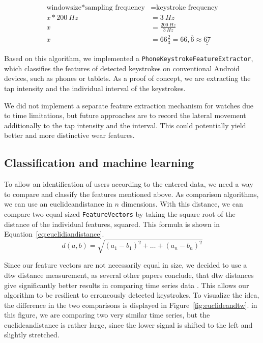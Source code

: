 \begin{equation}\label{eq:windowsize}\begin{split}
\textrm{windowsize} * \textrm{sampling frequency} & = \textrm{keystroke frequency}\\
x * \SI{200}{Hz} & = \SI{3}{Hz}\\
x & = \frac{\SI{200}{Hz}}{\SI{3}{Hz}}\\
x & = 66 \frac{2}{3} = 66,\overline{6} \approx \underline{\underline{67}}
\end{split}\end{equation}

Based on this algorithm, we implemented a \lstinline$PhoneKeystrokeFeatureExtractor$,
which classifies the features of detected keystrokes on conventional Android devices, such as phones or tablets. As a proof of concept, we are extracting the tap intensity and the individual interval of the keystrokes.
    
We did not implement a separate feature extraction mechanism for watches due to time limitations, but future approaches are to record the lateral movement additionally to the tap intensity and the interval. This could potentially yield better and more distinctive wear features.

\subsection{Classification and machine learning}
To allow an identification of users according to the entered data, we need a way to compare and classify the features mentioned above. 
As comparison algorithms, we can use an \gls{euclideandistance} in $n$ dimensions. With this distance, we can compare two equal sized \lstinline$FeatureVectors$ by taking the square root of the distance of the individual features, squared. This formula is shown in Equation~\ref{eq:euclidiandistance}.
\begin{equation}\label{eq:euclidiandistance}
d(a, b) = \sqrt{(a_1 - b_1)^2 + \ldots + (a_n - b_n)^2}
\end{equation}

Since our feature vectors are not necessarily equal in size, we decided to use a \gls{dtw} distance measurement, as several other papers conclude, that \gls{dtw} distances give significantly better results in comparing time series data \cite{ding2008querying}. This allows our algorithm to be resilient to erroneously detected keystrokes. To visualize the idea, the difference in the two comparisons is displayed in Figure~\ref{fig:euclideandtw}. in this figure, we are comparing two very similar time series, but the \gls{euclideandistance} is rather large, since the lower signal is shifted to the left and slightly stretched.

